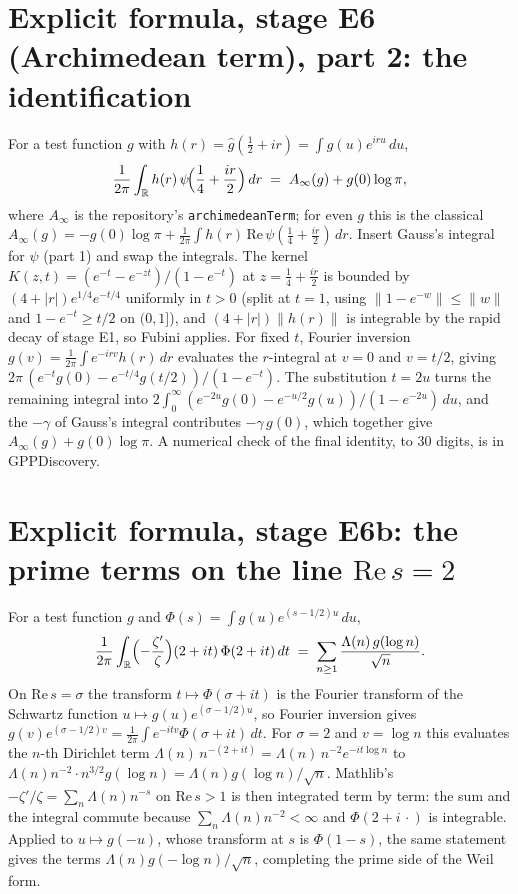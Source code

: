 \documentclass{report}
\theoremstyle{definition}
\begin{document}
\begin{itemize}
\begin{itemize}
\section{Explicit formula, stage E6 (Archimedean term), part 2: the identification}
For a test function $g$ with $h(r)=\hat g(\tfrac12+ir)=\int g(u)e^{iru}\,du$,
\[
\frac1{2\pi}\int_{\mathbb R}h(r)\,\psi\!\Bigl(\frac14+\frac{ir}2\Bigr)\,dr\;=\;A_\infty(g)+g(0)\log\pi ,
\]
where $A_\infty$ is the repository's \texttt{archimedeanTerm}; for even $g$ this is the classical $A_\infty(g)=-g(0)\log\pi+\frac1{2\pi}\int h(r)\,\mathrm{Re}\,\psi(\tfrac14+\tfrac{ir}2)\,dr$. Insert Gauss's integral for $\psi$ (part 1) and swap the integrals. The kernel $K(z,t)=(e^{-t}-e^{-zt})/(1-e^{-t})$ at $z=\tfrac14+\tfrac{ir}2$ is bounded by $(4+|r|)e^{1/4}e^{-t/4}$ uniformly in $t>0$ (split at $t=1$, using $\|1-e^{-w}\|\le\|w\|$ and $1-e^{-t}\ge t/2$ on $(0,1]$), and $(4+|r|)\|h(r)\|$ is integrable by the rapid decay of stage E1, so Fubini applies. For fixed $t$, Fourier inversion $g(v)=\frac1{2\pi}\int e^{-irv}h(r)\,dr$ evaluates the $r$-integral at $v=0$ and $v=t/2$, giving $2\pi\,(e^{-t}g(0)-e^{-t/4}g(t/2))/(1-e^{-t})$. The substitution $t=2u$ turns the remaining integral into $2\int_0^\infty(e^{-2u}g(0)-e^{-u/2}g(u))/(1-e^{-2u})\,du$, and the $-\gamma$ of Gauss's integral contributes $-\gamma\,g(0)$, which together give $A_\infty(g)+g(0)\log\pi$. A numerical check of the final identity, to 30 digits, is in GPPDiscovery.
\section{Explicit formula, stage E6b: the prime terms on the line $\mathrm{Re}\,s=2$}
For a test function $g$ and $\Phi(s)=\int g(u)e^{(s-1/2)u}\,du$,
\[
\frac1{2\pi}\int_{\mathbb R}\Bigl(-\frac{\zeta'}{\zeta}\Bigr)(2+it)\,\Phi(2+it)\,dt\;=\;\sum_{n\ge1}\frac{\Lambda(n)\,g(\log n)}{\sqrt n}.
\]
On $\mathrm{Re}\,s=\sigma$ the transform $t\mapsto\Phi(\sigma+it)$ is the Fourier transform of the Schwartz function $u\mapsto g(u)e^{(\sigma-1/2)u}$, so Fourier inversion gives $g(v)e^{(\sigma-1/2)v}=\frac1{2\pi}\int e^{-itv}\Phi(\sigma+it)\,dt$. For $\sigma=2$ and $v=\log n$ this evaluates the $n$-th Dirichlet term $\Lambda(n)\,n^{-(2+it)}=\Lambda(n)\,n^{-2}e^{-it\log n}$ to $\Lambda(n)n^{-2}\cdot n^{3/2}g(\log n)=\Lambda(n)g(\log n)/\sqrt n$. Mathlib's $-\zeta'/\zeta=\sum_n\Lambda(n)n^{-s}$ on $\mathrm{Re}\,s>1$ is then integrated term by term: the sum and the integral commute because $\sum_n\Lambda(n)n^{-2}<\infty$ and $\Phi(2+i\,\cdot)$ is integrable. Applied to $u\mapsto g(-u)$, whose transform at $s$ is $\Phi(1-s)$, the same statement gives the terms $\Lambda(n)g(-\log n)/\sqrt n$, completing the prime side of the Weil form.

\end{itemize}
\end{itemize}
\end{document}
